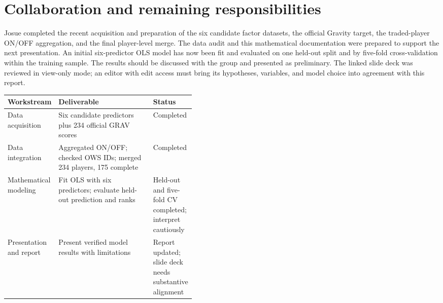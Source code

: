 \documentclass[11pt]{article}
\begin{document}
\section{Collaboration and remaining responsibilities}
Josue completed the recent acquisition and preparation of the six candidate
factor datasets, the official Gravity target, the traded-player ON/OFF
aggregation, and the final player-level merge. The data audit and this mathematical documentation were prepared to
support the next presentation. An initial six-predictor OLS model has now
been fit and evaluated on one held-out split and by five-fold
cross-validation within the training sample. The results should be
discussed with the group and presented as preliminary. The linked slide
deck was reviewed in view-only mode; an editor with edit access must bring
its hypotheses, variables, and model choice into agreement with this report.

\begin{center}
\small
\begin{tabularx}{\linewidth}{@{}p{0.24\linewidth}Xp{0.19\linewidth}@{}}
\toprule
\textbf{Workstream} & \textbf{Deliverable} & \textbf{Status}\\
\midrule
Data acquisition & Six candidate predictors plus 234 official GRAV scores & Completed\\
Data integration & Aggregated ON/OFF; checked OWS IDs; merged 234 players, 175 complete & Completed\\
Mathematical modeling & Fit OLS with six predictors; evaluate held-out prediction and ranks & Held-out and five-fold CV completed; interpret cautiously\\
Presentation and report & Present verified model results with limitations & Report updated; slide deck needs substantive alignment\\
\bottomrule
\end{tabularx}
\end{center}
\end{document}

